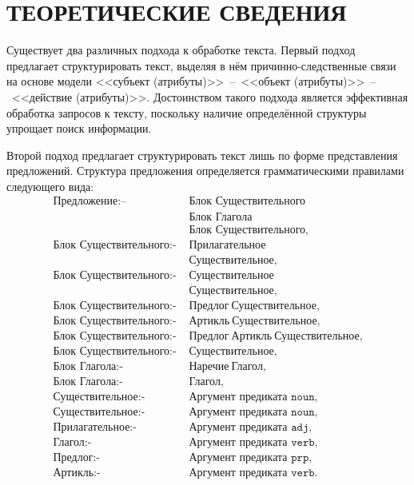 \section{ТЕОРЕТИЧЕСКИЕ СВЕДЕНИЯ}

Существует два различных подхода к обработке текста.
Первый подход предлагает структурировать текст, выделяя в нём
причинно-следственные связи на основе модели
<<субъект (атрибуты)>>~--~<<объект (атрибуты)>>~--~<<действие (атрибуты)>>.
Достоинством такого подхода является эффективная обработка запросов
к тексту, поскольку наличие определённой структуры упрощает поиск информации. 

Второй подход предлагает структурировать текст лишь по форме представления
предложений. Структура предложения определяется грамматическими правилами
следующего вида:
\begin{align*} %
  \texttt{Предложение:-- }          &\texttt{Блок Существительного} \\
                                    &\texttt{Блок Глагола} \\
                                    &\texttt{Блок Существительного}, \\
  \texttt{Блок Существительного:- } &\texttt{Прилагательное} \\
                                    &\texttt{Существительное}, \\
  \texttt{Блок Существительного:- } &\texttt{Существительное} \\
                                    &\texttt{Существительное}, \\
  \texttt{Блок Существительного:- } &\texttt{Предлог} \: \texttt{Существительное}, \\
  \texttt{Блок Существительного:- } &\texttt{Артикль} \: \texttt{Существительное}, \\
  \texttt{Блок Существительного:- } &\texttt{Предлог} \: \texttt{Артикль} \:
                                    \texttt{Существительное}, \\
  \texttt{Блок Существительного:- } &\texttt{Существительное}, \\
  \texttt{Блок Глагола:- }          &\texttt{Наречие} \: \texttt{Глагол}, \\
  \texttt{Блок Глагола:- }          &\texttt{Глагол}, \\
  \texttt{Существительное:- }       &\text{Аргумент предиката }\texttt{noun}, \\
  \texttt{Существительное:- }       &\text{Аргумент предиката }\texttt{noun}, \\
  \texttt{Прилагательное:- }        &\text{Аргумент предиката }\texttt{adj}, \\
  \texttt{Глагол:- }                &\text{Аргумент предиката }\texttt{verb}, \\
  \texttt{Предлог:- }               &\text{Аргумент предиката }\texttt{prp}, \\
  \texttt{Артикль:- }               &\text{Аргумент предиката }\texttt{verb}. \\
\end{align*}

\newpage